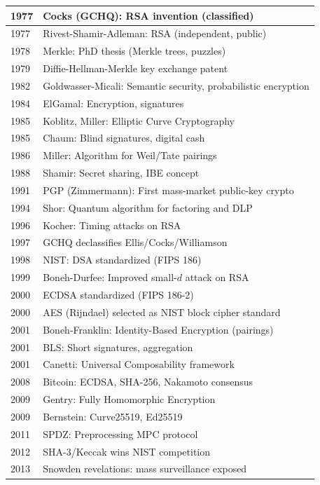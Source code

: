 \begin{tabularx}{\linewidth}{|l|X|}
1977 & Cocks (GCHQ): RSA invention (classified) \\ \hline
1977 & Rivest-Shamir-Adleman: RSA (independent, public) \\ \hline
1978 & Merkle: PhD thesis (Merkle trees, puzzles) \\ \hline
1979 & Diffie-Hellman-Merkle key exchange patent \\ \hline
1982 & Goldwasser-Micali: Semantic security, probabilistic encryption \\ \hline
1984 & ElGamal: Encryption, signatures \\ \hline
1985 & Koblitz, Miller: Elliptic Curve Cryptography \\ \hline
1985 & Chaum: Blind signatures, digital cash \\ \hline
1986 & Miller: Algorithm for Weil/Tate pairings \\ \hline
1988 & Shamir: Secret sharing, IBE concept \\ \hline
1991 & PGP (Zimmermann): First mass-market public-key crypto \\ \hline
1994 & Shor: Quantum algorithm for factoring and DLP \\ \hline
1996 & Kocher: Timing attacks on RSA \\ \hline
1997 & GCHQ declassifies Ellis/Cocks/Williamson \\ \hline
1998 & NIST: DSA standardized (FIPS 186) \\ \hline
1999 & Boneh-Durfee: Improved small-$d$ attack on RSA \\ \hline
2000 & ECDSA standardized (FIPS 186-2) \\ \hline
2000 & AES (Rijndael) selected as NIST block cipher standard \\ \hline
2001 & Boneh-Franklin: Identity-Based Encryption (pairings) \\ \hline
2001 & BLS: Short signatures, aggregation \\ \hline
2001 & Canetti: Universal Composability framework \\ \hline
2008 & Bitcoin: ECDSA, SHA-256, Nakamoto consensus \\ \hline
2009 & Gentry: Fully Homomorphic Encryption \\ \hline
2009 & Bernstein: Curve25519, Ed25519 \\ \hline
2011 & SPDZ: Preprocessing MPC protocol \\ \hline
2012 & SHA-3/Keccak wins NIST competition \\ \hline
2013 & Snowden revelations: mass surveillance exposed \\ \hline

\end{tabularx}
